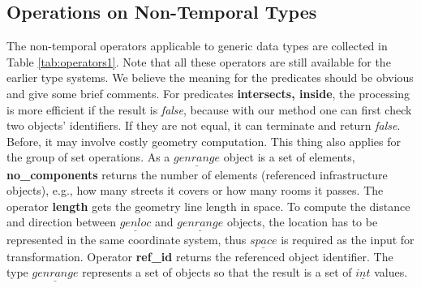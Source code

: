 \subsection{Operations on Non-Temporal Types}
\label{sec:non-temporalop}
The non-temporal operators applicable to generic data types  
are collected in Table \ref{tab:operators1}. Note that all these operators are still available 
for the earlier type systems. We believe the meaning for the predicates
should be obvious and give some brief comments. For predicates \textbf{intersects, inside},
the processing is more efficient if the result is \textit{false}, because with our method one 
can first check two objects' identifiers. If they are not equal, it can terminate and return
\textit{false}. Before, it may involve costly geometry computation. This thing also
applies for the group of set operations. As a $\underline{genrange}$
object is a set of elements, \textbf{no\_components} returns the number of elements (referenced infrastructure objects), e.g., how many streets it covers or how many rooms it passes. 
The operator \textbf{length} gets the geometry line length in space. 
To compute the distance and direction between $\underline{genloc}$ and $\underline{genrange}$ objects, 
the location has to be represented in the same coordinate system,
thus $\underline{space}$ is required as the input for transformation. Operator \textbf{ref\_id} returns the referenced object identifier. The type $\underline{genrange}$ represents a set of objects so that the result is a set of $\underline{int}$ values. 


